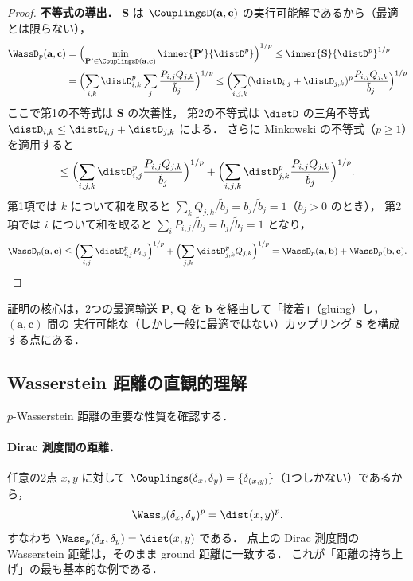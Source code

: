 \begin{proof}
  \medskip
  \textbf{不等式の導出．}
  $\mathbf{S}$ は $\CouplingsD(\mathbf{a}, \mathbf{c})$ の実行可能解であるから（最適とは限らない），
  \begin{align*}
    \WassD_p(\mathbf{a}, \mathbf{c})
    &= \Bigl(\min_{\mathbf{P}' \in \CouplingsD(\mathbf{a}, \mathbf{c})}
       \inner{\mathbf{P}'}{\distD^p}\Bigr)^{1/p}
    \leq \inner{\mathbf{S}}{\distD^p}^{1/p} \\
    &= \Bigl(\sum_{i,k} \distD_{i,k}^p
       \sum_j \frac{P_{i,j} Q_{j,k}}{\tilde{b}_j}\Bigr)^{1/p}
    \leq \Bigl(\sum_{i,j,k}
       (\distD_{i,j} + \distD_{j,k})^p
       \frac{P_{i,j} Q_{j,k}}{\tilde{b}_j}\Bigr)^{1/p}
  \end{align*}
  ここで第1の不等式は $\mathbf{S}$ の次善性，
  第2の不等式は $\distD$ の三角不等式 $\distD_{i,k} \leq \distD_{i,j} + \distD_{j,k}$
  による．
  さらに Minkowski の不等式（$p \geq 1$）を適用すると
  \[
    \leq \Bigl(\sum_{i,j,k}
       \distD_{i,j}^p \frac{P_{i,j} Q_{j,k}}{\tilde{b}_j}\Bigr)^{1/p}
    + \Bigl(\sum_{i,j,k}
       \distD_{j,k}^p \frac{P_{i,j} Q_{j,k}}{\tilde{b}_j}\Bigr)^{1/p}.
  \]
  第1項では $k$ について和を取ると
  $\sum_k Q_{j,k} / \tilde{b}_j = b_j / \tilde{b}_j = 1$（$b_j > 0$ のとき），
  第2項では $i$ について和を取ると
  $\sum_i P_{i,j} / \tilde{b}_j = b_j / \tilde{b}_j = 1$ となり，
  \[
    \WassD_p(\mathbf{a}, \mathbf{c})
    \leq \Bigl(\sum_{i,j} \distD_{i,j}^p P_{i,j}\Bigr)^{1/p}
    + \Bigl(\sum_{j,k} \distD_{j,k}^p Q_{j,k}\Bigr)^{1/p}
    = \WassD_p(\mathbf{a}, \mathbf{b})
    + \WassD_p(\mathbf{b}, \mathbf{c}).
  \]
\end{proof}

証明の核心は，2つの最適輸送 $\mathbf{P}$, $\mathbf{Q}$ を
$\mathbf{b}$ を経由して「接着」（gluing）し，$(\mathbf{a}, \mathbf{c})$ 間の
実行可能な（しかし一般に最適ではない）カップリング $\mathbf{S}$ を構成する点にある．

\subsection{Wasserstein 距離の直観的理解}

$p$-Wasserstein 距離の重要な性質を確認する．

\paragraph{Dirac 測度間の距離．}
任意の2点 $x, y$ に対して
$\Couplings(\delta_x, \delta_y) = \{\delta_{(x,y)}\}$（1つしかない）であるから，
\[
  \Wass_p(\delta_x, \delta_y)^p = \dist(x, y)^p.
\]
すなわち $\Wass_p(\delta_x, \delta_y) = \dist(x,y)$ である．
点上の Dirac 測度間の Wasserstein 距離は，そのまま ground 距離に一致する．
これが「距離の持ち上げ」の最も基本的な例である．

